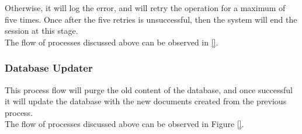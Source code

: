 Otherwise, it will log the error, and will retry the operation for a 
maximum of five times. Once after the five retries is unsuccessful, 
then the system will end the session at this stage.
\hfill \\

The flow of processes discussed above can be 
observed in \ref{}.
\subsubsection{Database Updater}
\label{subsubsec:db_updater}
This process flow will purge the old content of 
the database, and once successful it will update the database with the 
new documents created from the previous process.
\hfill \\

The flow of processes discussed above can be observed 
in Figure \ref{}.
